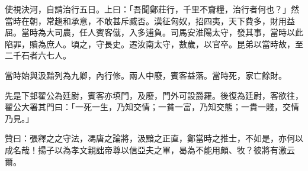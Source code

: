 \begin{pinyinscope}
使視決河，自請治行五日。上曰：「吾聞鄭莊行，千里不齎糧，治行者何也？」然當時在朝，常趨和承意，不敢甚斥臧否。漢征匈奴，招四夷，天下費多，財用益屈。當時為大司農，任人賓客僦，入多逋負。司馬安淮陽太守，發其事，當時以此陷罪，贖為庶人。頃之，守長史。遷汝南太守，數歲，以官卒。昆弟以當時故，至二千石者六七人。

當時始與汲黯列為九卿，內行修。兩人中廢，賓客益落。當時死，家亡餘財。

先是下邽翟公為廷尉，賓客亦填門，及廢，門外可設爵羅。後復為廷尉，客欲往，翟公大署其門曰：「一死一生，乃知交情；一貧一富，乃知交態；一貴一賤，交情乃見。」

贊曰：張釋之之守法，馮唐之論將，汲黯之正直，鄭當時之推士，不如是，亦何以成名哉！揚子以為孝文親詘帝尊以信亞夫之軍，曷為不能用頗、牧？彼將有激云爾。


\end{pinyinscope}